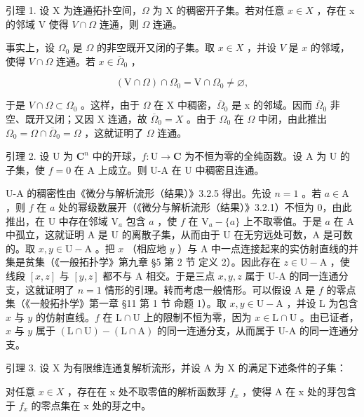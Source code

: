 
引理 1. 设 X 为连通拓扑空间，\(\Omega\) 为 X 的稠密开子集。若对任意 \(x \in X\) ，存在 x 的邻域 V 使得 \(V \cap \Omega\) 连通，则 \(\Omega\) 连通。

事实上，设 \(\Omega_0\) 是 \(\Omega\) 的非空既开又闭的子集。取 \(x \in X\) ，并设 \(V\) 是 \(x\) 的邻域，使得 \(V \cap \Omega\) 连通。若 \(x \in \overline{\Omega}_0\) ，

\[
(\mathrm{V} \cap \Omega) \cap \Omega_ {0} = \mathrm{V} \cap \Omega_ {0} \neq \varnothing ,
\]

于是 \(V \cap \Omega \subset \Omega_{0}\) 。这样，由于 \(\Omega\) 在 X 中稠密，\(\overline{\Omega}_{0}\) 是 x 的邻域。因而 \(\overline{\Omega}_{0}\) 非空、既开又闭；又因 X 连通，故 \(\overline{\Omega}_{0} = X\) 。由于 \(\Omega_{0}\) 在 \(\Omega\) 中闭，由此推出 \(\Omega_{0} = \Omega \cap \overline{\Omega}_{0} = \Omega\) ，这就证明了 \(\Omega\) 连通。

引理 2. 设 U 为 \(\mathbf{C}^n\) 中的开球，\(f: \mathrm{U} \to \mathbf{C}\) 为不恒为零的全纯函数。设 A 为 U 的子集，使 \(f = 0\) 在 A 上成立。则 U-A 在 U 中稠密且连通。

U-A 的稠密性由《微分与解析流形（结果）》3.2.5 得出。先设 \(n = 1\) 。若 \(a \in \mathrm{A}\) ，则 \(f\) 在 \(a\) 处的幂级数展开（《微分与解析流形（结果）》3.2.1）不恒为 0，由此推出，在 U 中存在邻域 \(\mathrm{V}_a\) 包含 \(a\) ，使 \(f\) 在 \(\mathrm{V}_a - \{a\}\) 上不取零值。于是 \(a\) 在 A 中孤立，这就证明 A 是 U 的离散子集，从而由于 U 在无穷远处可数，A 是可数的。取 \(x, y \in \mathrm{U} - \mathrm{A}\) 。把 \(x\) （相应地 \(y\) ）与 A 中一点连接起来的实仿射直线的并集是贫集（《一般拓扑学》第九章 §5 第 2 节 定义 2）。因此存在 \(z \in \mathrm{U} - \mathrm{A}\) ，使线段 \([x, z]\) 与 \([y, z]\) 都不与 A 相交。于是三点 \(x, y, z\) 属于 U-A 的同一连通分支，这就证明了 \(n = 1\) 情形的引理。转而考虑一般情形。可以假设 A 是 \(f\) 的零点集（《一般拓扑学》第一章 §11 第 1 节 命题 1）。取 \(x, y \in \mathrm{U} - \mathrm{A}\) ，并设 L 为包含 \(x\) 与 \(y\) 的仿射直线。\(f\) 在 \(\mathrm{L} \cap \mathrm{U}\) 上的限制不恒为零，因为 \(x \in \mathrm{L} \cap \mathrm{U}\) 。由已证者，\(x\) 与 \(y\) 属于 \((\mathrm{L} \cap \mathrm{U}) - (\mathrm{L} \cap \mathrm{A})\) 的同一连通分支，从而属于 U-A 的同一连通分支。

引理 3. 设 X 为有限维连通复解析流形，并设 A 为 X 的满足下述条件的子集：

对任意 \(x \in X\) ，存在在 x 处不取零值的解析函数芽 \(f_{x}\) ，使得 A 在 x 处的芽包含于 \(f_{x}\) 的零点集在 x 处的芽之中。

